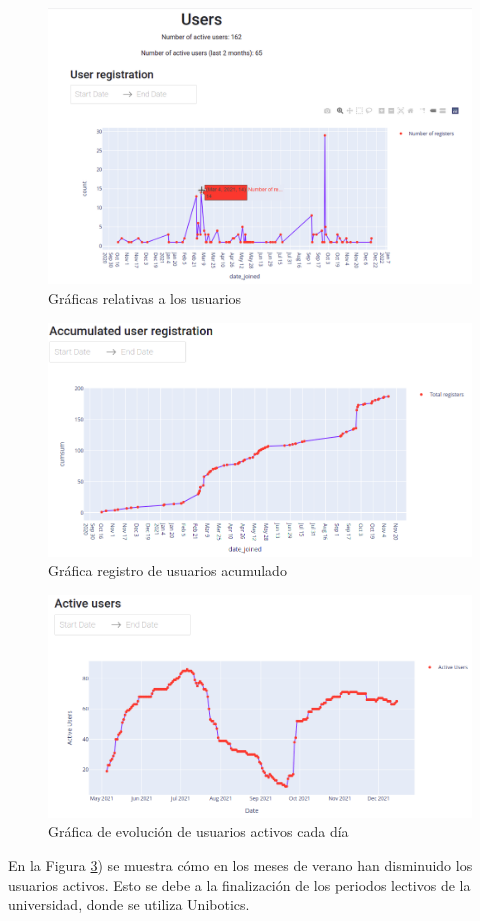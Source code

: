 \begin{figure}[H]
    \centering
    \includegraphics[width=14cm, keepaspectratio]{img/users.png}
    \caption{Gráficas relativas a los usuarios}
    \label{fig:users}
\end{figure}
\begin{figure}[H]
    \centering
    \includegraphics[width=14cm, keepaspectratio]{img/accumulated.png}
    \caption{Gráfica registro de usuarios acumulado}
    \label{fig:accumulated}
\end{figure}
\begin{figure}[H]
    \centering
    \includegraphics[width=15cm, keepaspectratio]{img/active.png}
    \caption{Gráfica de evolución de usuarios activos cada día}
    \label{fig:active}
\end{figure}
En la Figura \ref{fig:active}) se muestra cómo en los meses de verano han disminuido los usuarios activos. Esto se debe a la finalización de los periodos lectivos de la universidad, donde se utiliza Unibotics.\\

